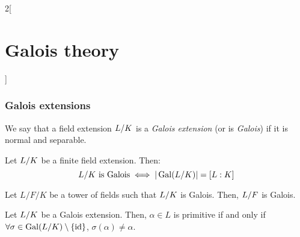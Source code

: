\documentclass[../../../main.tex]{subfiles}
\begin{document}
\begin{multicols}{2}[\section{Galois theory}]
  \subsubsection{Galois extensions}
  \begin{definition}
    We say that a field extension $\quot{L}{K}$ is a \emph{Galois extension} (or is \emph{Galois}) if it is normal and separable.
  \end{definition}
  \begin{theorem}
    Let $\quot{L}{K}$ be a finite field extension. Then: $$\textstyle\quot{L}{K}\text{ is Galois}\iff|\Gal(\quot{L}{K})|=[L:K]$$
  \end{theorem}
  \begin{lemma}
    Let $L/F/K$ be a tower of fields such that $\quot{L}{K}$ is Galois. Then, $\quot{L}{F}$ is Galois.
  \end{lemma}
  \begin{prop}
    Let $\quot{L}{K}$ be a Galois extension. Then, $\alpha\in L$ is primitive if and only if $\forall \sigma\in\Gal(\quot{L}{K})\setminus\{\id\}$, $\sigma(\alpha)\ne\alpha$.
  \end{prop}

\end{multicols}
\end{document}

